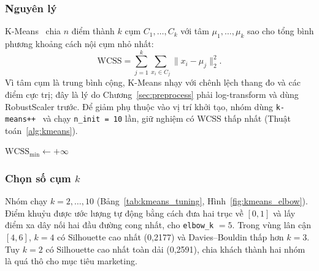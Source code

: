 \documentclass[../report.tex]{subfiles}
\begin{document}
\subsubsection{Nguyên lý}

K-Means~\cite{lloyd1982} chia $n$ điểm thành $k$ cụm $C_1,\ldots,C_k$ với tâm $\mu_1,\ldots,\mu_k$ sao cho tổng bình phương khoảng cách nội cụm nhỏ nhất:
\begin{equation}
\mathrm{WCSS} = \sum_{j=1}^{k} \sum_{x_i \in C_j} \lVert x_i - \mu_j \rVert_2^2.
\label{eq:wcss}
\end{equation}
Vì tâm cụm là trung bình cộng, K-Means nhạy với chênh lệch thang đo và các điểm cực trị; đây là lý do Chương~\ref{sec:preprocess} phải log-transform và dùng RobustScaler trước. Để giảm phụ thuộc vào vị trí khởi tạo, nhóm dùng \texttt{k-means++}~\cite{arthur2007} và chạy \texttt{n\_init = 10} lần, giữ nghiệm có WCSS thấp nhất (Thuật toán~\ref{alg:kmeans}).

\begin{algorithm}[H]
\caption{K-Means (Lloyd kết hợp \texttt{k-means++})}
\label{alg:kmeans}
$\mathrm{WCSS}_{\min} \leftarrow +\infty$\;
\end{algorithm}

\subsubsection{Chọn số cụm $k$}

Nhóm chạy $k = 2,\ldots,10$ (Bảng~\ref{tab:kmeans_tuning}, Hình~\ref{fig:kmeans_elbow}). Điểm khuỷu được ước lượng tự động bằng cách đưa hai trục về $[0,1]$ và lấy điểm xa dây nối hai đầu đường cong nhất, cho \texttt{elbow\_k} $= 5$. Trong vùng lân cận $[4,6]$, $k = 4$ có Silhouette cao nhất (0,2177) và Davies--Bouldin thấp hơn $k=3$. Tuy $k = 2$ có Silhouette cao nhất toàn dải (0,2591), chia khách thành hai nhóm là quá thô cho mục tiêu marketing.
\end{document}
